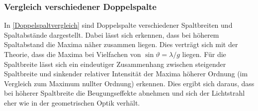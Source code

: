 \documentclass[
	a4paper,
	12pt,
	pagesize,
	ngerman
]{scrartcl}
\begin{document}
	\subsubsection{Vergleich verschiedener Doppelspalte}
	In \cref{Doppelspaltvergleich} sind Doppelspalte verschiedener Spaltbreiten und Spaltabstände dargestellt.
	Dabei lässt sich erkennen, dass bei höherem Spaltabstand die Maxima näher zusammen liegen.
	Dies verträgt sich mit der Theorie, dass die Maxima bei Vielfachen von $\sin \vartheta = \lambda /g $ liegen. \label{Doppelspalttheo}
	Für die Spaltbreite lässt sich ein eindeutiger Zusammenhang zwischen steigender Spaltbreite und sinkender relativer Intensität der Maxima höherer Ordnung (im Vergleich zum Maximum nullter Ordnung) erkennen.
	Dies ergibt sich daraus, dass bei höherer Spaltbreite die Beugungseffekte abnehmen und sich der Lichtstrahl eher wie in der geometrischen Optik verhält.
	
\end{document}
